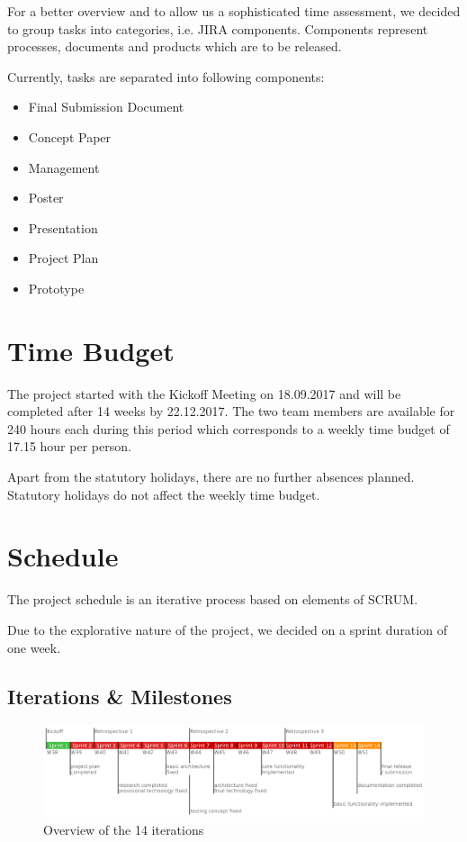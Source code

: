 For a better overview and to allow us a sophisticated time assessment, we decided to group tasks into categories, i.e. JIRA components. Components represent processes, documents and products which are to be released.

Currently, tasks are separated into following components:

\begin{multicols}{2}
	\begin{itemize}
		\item Final Submission Document
		\item Concept Paper
		\item Management
		\item Poster
		\item Presentation
		\item Project Plan
		\item Prototype
	\end{itemize}
\end{multicols}

\section{Time Budget}

The project started with the Kickoff Meeting on 18.09.2017 and will be completed after 14 weeks by 22.12.2017.
The two team members are available for 240 hours each during this period which corresponds to a weekly time budget of 17.15 hour per person.

Apart from the statutory holidays, there are no further absences planned. Statutory holidays do not affect the weekly time budget.

\section{Schedule}
The project schedule is an iterative process based on elements of SCRUM. 

Due to the explorative nature of the project, we decided on a sprint duration of one week.
\subsection{Iterations \& Milestones}

\begin{figure}[h]
	\centering
	\includegraphics[width=1\linewidth]{resources/overview}
	\caption{Overview of the 14 iterations}
	\label{fig:overview}
\end{figure}

